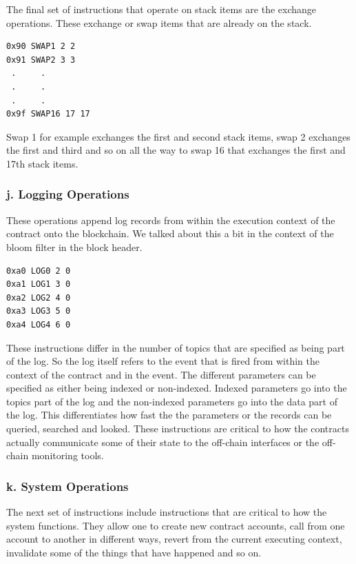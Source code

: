 The final set of instructions that operate on stack items are the exchange operations.
These exchange or swap items that are already on the stack.

\begin{lstlisting}[style=defaultStyle, caption={Exchange instructions.}]
0x90 SWAP1 2 2
0x91 SWAP2 3 3
 .     .
 .     .
 .     .
0x9f SWAP16 17 17
\end{lstlisting}

Swap 1 for example exchanges the first and second stack items, swap 2 exchanges the first and third and so on all the way to swap 16 that exchanges the first and 17th stack items.

\subsubsection*{j. Logging Operations}

These operations append log records from within the execution context of the contract onto the blockchain.
We talked about this a bit in the context of the bloom filter in the block header.

\begin{lstlisting}[style=defaultStyle, caption={Log instructions.}]
0xa0 LOG0 2 0
0xa1 LOG1 3 0
0xa2 LOG2 4 0
0xa3 LOG3 5 0
0xa4 LOG4 6 0
\end{lstlisting}

These instructions differ in the number of topics that are specified as being part of the log.
So the log itself refers to the event that is fired from within the context of the contract and in the event.
The different parameters can be specified as either being indexed or non-indexed.
Indexed parameters go into the topics part of the log and the non-indexed parameters go into the data part of the log. 
This differentiates how fast the the parameters or the records can be queried, searched and looked.
These instructions are critical to how the contracts actually communicate some of their state to the off-chain interfaces or the off-chain monitoring tools.

\subsubsection*{k. System Operations}
The next set of instructions include instructions that are critical to how the system functions.
They allow one to create new contract accounts, call from one account to another in different ways, revert from the current executing context, invalidate some of the things that have happened and so on.

